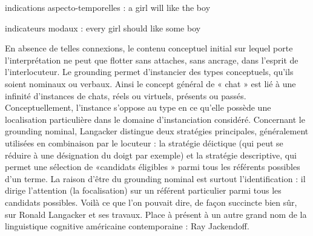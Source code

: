 \noindent{\color{BellaTeal}$\diamond$}\hspace{.6em}indications aspecto-temporelles : a girl will like the boy\par


\noindent{\color{BellaTeal}$\diamond$}\hspace{.6em}indicateurs modaux : every girl should like some boy\par
En absence de telles connexions, le contenu conceptuel initial sur lequel porte l'interprétation ne peut que flotter sans attaches, sans ancrage, dans l’esprit de l'interlocuteur. Le grounding permet d’instancier des types conceptuels, qu’ils soient nominaux ou verbaux. Ainsi le concept général de « chat » est lié à une infinité d’instances de chats, réels ou virtuels, présents ou passés. Conceptuellement, l'instance s’oppose au type en ce qu’elle possède une localisation particulière dans le domaine d’instanciation considéré. Concernant le grounding nominal, Langacker distingue deux stratégies principales, généralement utilisées en combinaison par le locuteur : la stratégie déictique (qui peut se réduire à une désignation du doigt par exemple) et la stratégie descriptive, qui permet une sélection de «candidats éligibles » parmi tous les référents possibles d’un terme. La raison d’être du grounding nominal est surtout l’identification : il dirige l’attention (la focalisation) sur un référent particulier parmi tous les candidats possibles. Voilà ce que l’on pouvait dire, de façon succincte bien sûr, sur Ronald Langacker et ses travaux. Place à présent à un autre grand nom de la linguistique cognitive américaine contemporaine : Ray Jackendoff.\par


